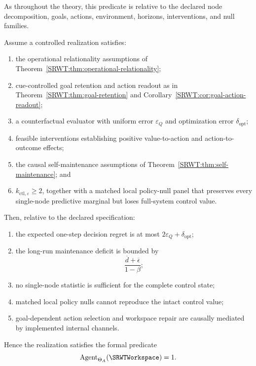 As throughout the theory, this predicate is relative to the declared node
decomposition, goals, actions, environment, horizons, interventions, and null
families.


\begin{SRWTtheorem}
\label{SRWT:thm:agency-synthesis}
Assume a controlled realization satisfies:
\begin{enumerate}
\item the operational relationality assumptions of
 Theorem~\ref{SRWT:thm:operational-relationality};
\item cue-controlled goal retention and action readout as in
 Theorem~\ref{SRWT:thm:goal-retention} and
 Corollary~\ref{SRWT:cor:goal-action-readout};
\item a counterfactual evaluator with uniform error \(\varepsilon_Q\) and
 optimization error \(\delta_{\mathrm{opt}}\);
\item feasible interventions establishing positive value-to-action and
 action-to-outcome effects;
\item the causal self-maintenance assumptions of
 Theorem~\ref{SRWT:thm:self-maintenance}; and
\item \(k_{\mathrm{ctl},\varepsilon}\geq2\), together with a matched local
 policy-null panel that preserves every single-node predictive marginal
 but loses full-system control value.
\end{enumerate}
Then, relative to the declared specification:
\begin{enumerate}
\item the expected one-step decision regret is at most
 \(2\varepsilon_Q+\delta_{\mathrm{opt}}\);
\item the long-run maintenance deficit is bounded by
 \[
 \frac{\overline d+\overline\epsilon}{1-\beta};
 \]
\item no single-node statistic is sufficient for the complete control state;
\item matched local policy nulls cannot reproduce the intact control value;
\item goal-dependent action selection and workspace repair are causally
 mediated by implemented internal channels.
\end{enumerate}
Hence the realization satisfies the formal predicate
\[
\operatorname{Agent}_{\Theta_A}(\SRWTWorkspace)=1.
\]
\end{SRWTtheorem}

